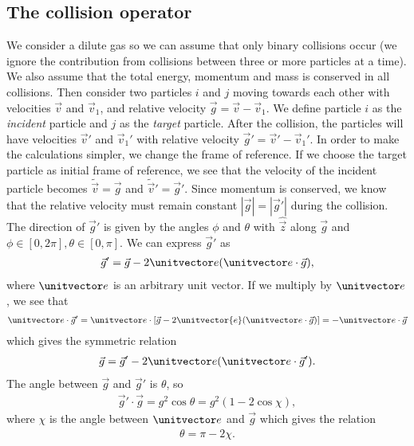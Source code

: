 \subsection{The collision operator}
\label{sec:boltzmann_collision_operator}
We consider a dilute gas so we can assume that only binary collisions occur (we ignore the contribution from collisions between three or more particles at a time). We also assume that the total energy, momentum and mass is conserved in all collisions. Then consider two particles $i$ and $j$ moving towards each other with velocities $\vec v$ and $\vec v_1$, and relative velocity $\vec g = \vec v - \vec v_1$. We define particle $i$ as the \textit{incident} particle and $j$ as the \textit{target} particle. After the collision, the particles will have velocities $\vec v'$ and $\vec v_1'$ with relative velocity $\vec g' = \vec v' - \vec v_1'$. In order to make the calculations simpler, we change the frame of reference. If we choose the target particle as initial frame of reference, we see that the velocity of the incident particle becomes $\tilde {\vec v} = \vec g$ and $\tilde {\vec v}' = \vec g'$. Since momentum is conserved, we know that the relative velocity must remain constant $|\vec g| = |\vec g'|$ during the collision. The direction of $\vec g'$ is given by the angles $\phi$ and $\theta$ with $\hat {\vec z}$ along $\vec g$ and $\phi \in [0, 2\pi], \theta \in [0, \pi]$. We can express $\vec g'$ as
\begin{align}
	\vec g' = \vec g - 2\unitvector e(\unitvector e\cdot\vec g),
\end{align}
where $\unitvector e$ is an arbitrary unit vector.  If we multiply by $\unitvector e$, we see that 
\begin{align}
	\unitvector e\cdot \vec g' = \unitvector e\cdot\left[\vec g - 2\unitvector{e}(\unitvector e\cdot\vec g)\right] = -\unitvector e \cdot \vec g
\end{align}
which gives the symmetric relation
\begin{align}
	\vec g = \vec g' - 2\unitvector e(\unitvector e\cdot\vec g').
\end{align}
The angle between $\vec g$ and $\vec g'$ is $\theta$, so
\begin{align}
	\vec g'\cdot \vec g = g^2\cos\theta = g^2(1 - 2\cos \chi),
\end{align}
where $\chi$ is the angle between $\unitvector e$ and $\vec g$ which gives the relation
\begin{align}
	\theta = \pi - 2\chi.
\end{align}
